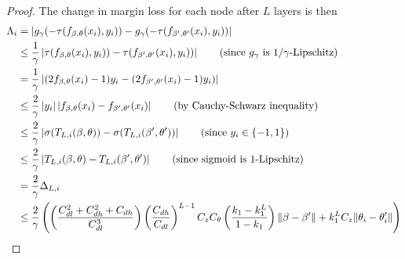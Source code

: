 \begin{proof}
    The change in margin loss for each node after $L$ layers is then 
    \begin{align*}
        \Lambda_i 
        &= \left|g_\gamma(-\tau (f_{\beta, \theta}(x_i), y_i)) - g_\gamma(-\tau (f_{\beta^\prime, \theta^\prime}(x_i), y_i))\right|\\
        &\leq \frac{1}{\gamma}\left|\tau (f_{\beta, \theta}(x_i), y_i)) - \tau (f_{\beta^\prime, \theta^\prime}(x_i), y_i))\right|
        \tag{since $g_\gamma$ is $1/\gamma$-Lipschitz}\\
        &= \frac{1}{\gamma}\left|(2f_{\beta, \theta}(x_i) - 1) y_i-(2f_{\beta^\prime, \theta^\prime}(x_i) - 1) y_i)\right|\\
        &\leq \frac{2}{\gamma}\left|y_i\right|\left|f_{\beta, \theta}(x_i) - f_{\beta^\prime, \theta^\prime}(x_i)\right|
        \tag{by Cauchy-Schwarz inequality}\\
        &\leq \frac{2}{\gamma}\left|\sigma(T_{L, i}(\beta, \theta)) - \sigma(T_{L, i}(\beta^\prime, \theta^\prime))\right|
        \tag{since $y_i \in \{-1,1\}$}\\
        &\leq \frac{2}{\gamma}\left|T_{L, i}(\beta, \theta) - T_{L, i}(\beta^\prime, \theta^\prime)\right| 
        \tag{since sigmoid is $1$-Lipschitz}\\
        &= \frac{2}{\gamma} \Delta_{L, i}\\
        &\leq \frac{2}{\gamma} \left(\left(
        \frac{C_{dl}^2 + C_{dh}^2 + C_{dh}}{C_{dl}^3}
        \right)\left(\frac{C_{dh}}{C_{dl}}\right)^{L-1} C_z C_\theta \left(\frac{k_1 - k_1^L}{1-k_1} \right) \|\beta - \beta^\prime\| + k_1^L C_z \|\theta_i - \theta_i^\prime\|\right) 
    \end{align*}
\end{proof}

